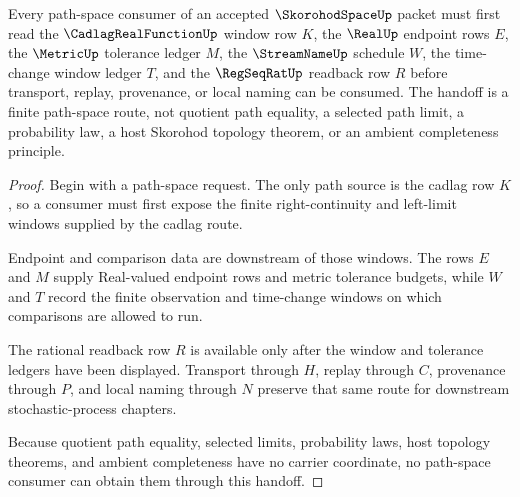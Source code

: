 \begin{theorem}
\label{thm:skorohod-space-cadlag-window-handoff}
Every path-space consumer of an accepted $\SkorohodSpaceUp$ packet must first read the $\CadlagRealFunctionUp$ window row $K$, the $\RealUp$ endpoint rows $E$, the $\MetricUp$ tolerance ledger $M$, the $\StreamNameUp$ schedule $W$, the time-change window ledger $T$, and the $\RegSeqRatUp$ readback row $R$ before transport, replay, provenance, or local naming can be consumed. The handoff is a finite path-space route, not quotient path equality, a selected path limit, a probability law, a host Skorohod topology theorem, or an ambient completeness principle.
\end{theorem}
\begin{proof}
Begin with a path-space request. The only path source is the cadlag row $K$, so a consumer must first expose the finite right-continuity and left-limit windows supplied by the cadlag route.

Endpoint and comparison data are downstream of those windows. The rows $E$ and $M$ supply Real-valued endpoint rows and metric tolerance budgets, while $W$ and $T$ record the finite observation and time-change windows on which comparisons are allowed to run.

The rational readback row $R$ is available only after the window and tolerance ledgers have been displayed. Transport through $H$, replay through $C$, provenance through $P$, and local naming through $N$ preserve that same route for downstream stochastic-process chapters.

Because quotient path equality, selected limits, probability laws, host topology theorems, and ambient completeness have no carrier coordinate, no path-space consumer can obtain them through this handoff.
\end{proof}


